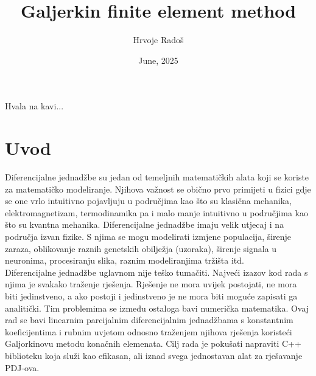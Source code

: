 \documentclass[zavrsnirad]{../fer}
\title{Galjerkin finite element method}
\author{Hrvoje Radoš}
\date{June, 2025}
\begin{document}
\maketitle






\begin{zahvale}
	Hvala na kavi...
\end{zahvale}


\mainmatter


\tableofcontents


\chapter{Uvod}
\label{pog:uvod}
Diferencijalne jednadžbe su jedan od temeljnih matematičkih
alata koji se koriste za matematičko modeliranje. Njihova
važnost se obično prvo primijeti u fizici gdje se one vrlo
intuitivno pojavljuju u područjima kao što su klasična mehanika,
elektromagnetizam, termodinamika pa i malo manje intuitivno u
područjima kao što su kvantna mehanika. Diferencijalne jednadžbe
imaju velik utjecaj i na područja izvan fizike.
S njima se mogu modelirati izmjene populacija, širenje zaraza,
oblikovanje raznih genetskih obilježja (uzoraka),
širenje signala u neuronima, procesiranju slika, raznim
modeliranjima tržišta itd.
\bigskip
\\
Diferencijalne jednadžbe uglavnom nije teško tumačiti. Najveći
izazov kod rada s njima je svakako traženje rješenja.
Rješenje ne mora uvijek postojati, ne mora biti jedinstveno,
a ako postoji i jedinstveno je ne mora biti moguće zapisati
ga analitički. Tim problemima se između ostaloga bavi numerička
matematika. Ovaj rad se bavi linearnim parcijalnim diferencijalnim
jednadžbama s konstantnim koeficijentima i rubnim uvjetom odnosno
traženjem njihova rješenja koristeći Galjorkinovu metodu
konačnih elemenata. Cilj rada je pokušati  napraviti
C++ biblioteku koja služi kao efikasan, ali iznad svega
jednostavan alat za rješavanje PDJ-ova.
\newpage
\end{document}
